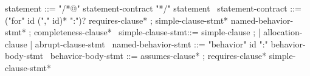 \begin{syntax}
  statement ::= "/*@" statement-contract "*/" statement
  \
  statement-contract ::= ("for" id ("," id)* ":")? requires-clause* ;
    simple-clause-stmt* named-behavior-stmt* ;
    completeness-clause*
  \
  simple-clause-stmt::= simple-clause ;
                      | allocation-clause | abrupt-clause-stmt
  \
  named-behavior-stmt ::= "behavior" id ":" behavior-body-stmt
  \
  behavior-body-stmt ::= assumes-clause* ;
       requires-clause* simple-clause-stmt*
\end{syntax}

